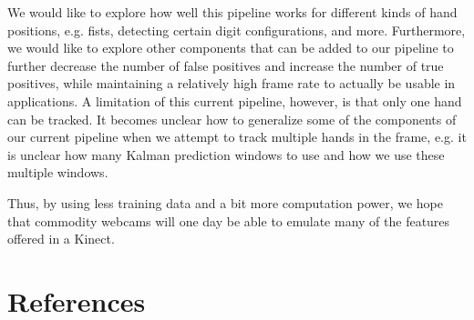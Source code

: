 \documentclass[12pt]{article}
\begin{document}
We would like to explore how well this pipeline works for different kinds of hand positions, e.g. fists, detecting certain digit configurations, and more. Furthermore, we would like to explore other components that can be added to our pipeline to further decrease the number of false positives and increase the number of true positives, while maintaining a relatively high frame rate to actually be usable in applications. A limitation of this current pipeline, however, is that only one hand can be tracked. It becomes unclear how to generalize some of the components of our current pipeline when we attempt to track multiple hands in the frame, e.g. it is unclear how many Kalman prediction windows to use and how we use these multiple windows.

Thus, by using less training data and a bit more computation power, we hope that commodity webcams will one day be able to emulate many of the features offered in a Kinect.

\section{References}
\end{document}

